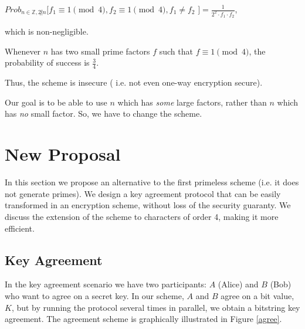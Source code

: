 \documentclass[11pt, a4paper, twoside, openright]{report}
\begin{document}
	    \hspace{10 mm} $Prob_{n \in \mathbb{Z}, 2 \not | n}[ f_1 \equiv 1 \pmod{4}, f_2 \equiv 1 \pmod{4}, f_1 \not= f_2$  $ ] = \frac{1}{ 2^2 \cdot f_1 \cdot f_2}$, 
		
		\noindent which is non-negligible.
		
		Whenever $n$ has two small prime factors $f$ such that $ f \equiv 1 \pmod{4} $, the probability of success is $\frac{3}{4}$. 
	
		Thus, the scheme is insecure ( i.e. not even one-way encryption secure). 
		
		Our goal is to be able to use $n$ which has \textit{some} large factors, rather than $n$ which has \textit{no} small factor. So, we have to change 
		the scheme.

\clearpage
	
\section{New Proposal}


	In this section we propose an alternative to the first primeless scheme (i.e. it does not generate primes). We design a key agreement protocol that can be easily transformed in an 
	encryption scheme, without loss of the security guaranty. We discuss the extension of the scheme to characters of order 4, making it more efficient.  
	
	\subsection{Key Agreement}
		In the key agreement scenario we have two participants: $A$ (Alice) and $B$ (Bob) who want to agree on a secret key. In our scheme,
		$A$ and $B$ agree on a bit value, $K$, but by running the protocol several times in parallel, we obtain a bitstring key agreement. The agreement
		scheme is graphically illustrated in Figure \ref{agree}. 
		
\end{document}
